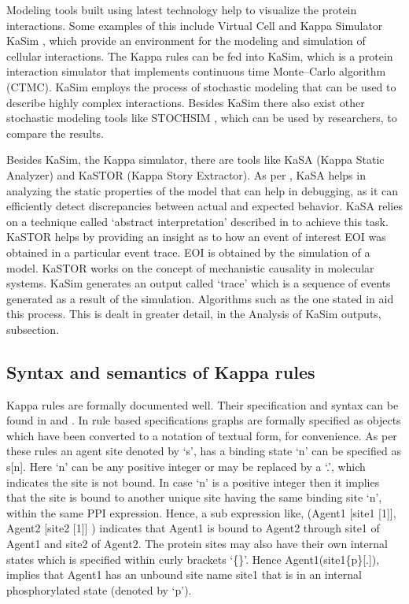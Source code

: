 \documentclass[msc,deptreport,ai]{infthesis}      %
\begin{document}
Modeling tools built using latest technology help to visualize the protein interactions. Some examples of this include Virtual Cell \cite{vcell} and Kappa Simulator KaSim \cite{kasim}, which provide an environment for the modeling and simulation of cellular interactions. The Kappa rules can be fed into KaSim, which is a protein interaction simulator that implements continuous time Monte–Carlo algorithm (CTMC). KaSim  employs the process of stochastic modeling that can be used to describe highly complex interactions. Besides KaSim there also exist other stochastic modeling tools like STOCHSIM \cite{stochsim}, which can be used by researchers, to compare the results.

Besides KaSim, the Kappa simulator, there are tools like KaSA (Kappa Static Analyzer) and KaSTOR (Kappa Story Extractor). As per \cite{kappaPlatform}, KaSA helps in analyzing the static properties of the model that can help in debugging, as it can efficiently detect discrepancies between actual and expected behavior. KaSA relies on a technique called `abstract interpretation' described in \cite{kappaPlatform} to achieve this task. KaSTOR helps by providing an insight as to how an event of interest EOI was obtained in a particular event trace. EOI is obtained by the simulation of a model. KaSTOR works on the concept of mechanistic causality in molecular systems. KaSim generates an output called `trace' which is a sequence of events generated as a result of the simulation. Algorithms such as the one stated in \cite{danos2012graphs} aid this process. This is dealt in greater detail, in the Analysis of KaSim outputs, subsection.

\subsection{Syntax and semantics of Kappa rules}
Kappa rules are formally documented well. Their specification and syntax can be found in \cite{kasim} and \cite{kappaURL}. In rule based specifications graphs are formally specified as objects which have been converted to a notation of textual form, for convenience. As per these rules an agent site denoted  by `s', has a binding state `n' can be specified as s[n]. Here `n' can be any positive integer or may be replaced by a `.', which indicates the site is not bound. In case `n' is a positive integer then it implies that the site is bound to another unique site having the same binding site `n', within the same PPI expression. Hence, a sub expression like, (Agent1 [site1 [1]], Agent2 [site2 [1]] ) indicates that Agent1 is bound to Agent2 through site1 of Agent1 and site2 of Agent2. The protein sites may also have their own internal states which is specified within curly brackets `\{\}'. Hence Agent1(site1\{p\}[.]), implies that Agent1 has an unbound site name site1 that is in an internal phosphorylated state (denoted by `p'). 
\end{document}
